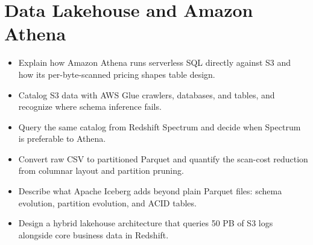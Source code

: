\chapter{Data Lakehouse and Amazon Athena}
%
\begin{objectives}
\begin{itemize}
    \item Explain how Amazon Athena runs serverless SQL directly against S3 and how its per-byte-scanned pricing shapes table design.
    \item Catalog S3 data with AWS Glue crawlers, databases, and tables, and recognize where schema inference fails.
    \item Query the same catalog from Redshift Spectrum and decide when Spectrum is preferable to Athena.
    \item Convert raw CSV to partitioned Parquet and quantify the scan-cost reduction from columnar layout and partition pruning.
    \item Describe what Apache Iceberg adds beyond plain Parquet files: schema evolution, partition evolution, and ACID tables.
    \item Design a hybrid lakehouse architecture that queries 50 PB of S3 logs alongside core business data in Redshift.
\end{itemize}
\end{objectives}

